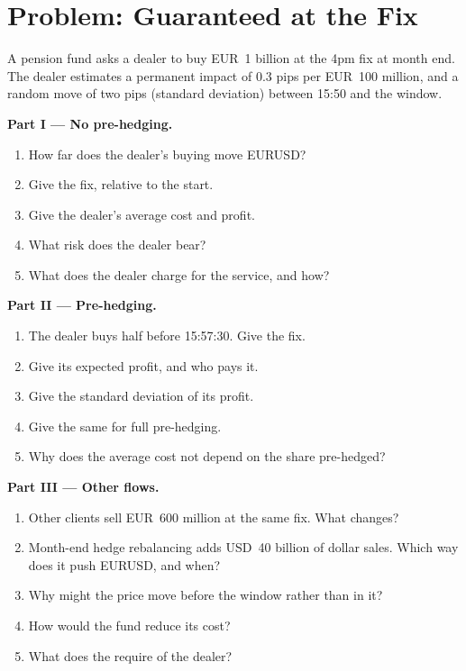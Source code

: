 \section{Problem: Guaranteed at the Fix}

\begin{problem}\label{pb:m2:fixings-and-flows:1}
A pension fund asks a dealer to buy EUR~1 billion at the 4pm fix at month end.
The dealer estimates a permanent impact of 0.3 pips per EUR~100 million, and a
random move of two pips (standard deviation) between 15:50 and the window.

\medskip\noindent\textbf{Part I --- No pre-hedging.}
\begin{enumerate}
\item How far does the dealer's buying move EURUSD?
\item Give the fix, relative to the start.
\item Give the dealer's average cost and profit.
\item What risk does the dealer bear?
\item What does the dealer charge for the service, and how?
\end{enumerate}

\medskip\noindent\textbf{Part II --- Pre-hedging.}
\begin{enumerate}[resume]
\item The dealer buys half before 15:57:30. Give the fix.
\item Give its expected profit, and who pays it.
\item Give the standard deviation of its profit.
\item Give the same for full pre-hedging.
\item Why does the average cost not depend on the share pre-hedged?
\end{enumerate}

\medskip\noindent\textbf{Part III --- Other flows.}
\begin{enumerate}[resume]
\item Other clients sell EUR~600 million at the same fix. What changes?
\item Month-end hedge rebalancing adds USD~40 billion of dollar sales. Which way does
it push EURUSD, and when?
\item Why might the price move before the window rather than in it?
\item How would the fund reduce its cost?
\item What does the  require of the dealer?
\end{enumerate}


\end{problem}

